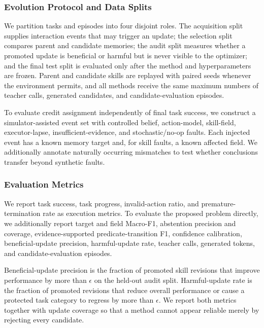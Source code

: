 \subsubsection{Evolution Protocol and Data Splits}

We partition tasks and episodes into four disjoint roles. The acquisition split supplies interaction events that may trigger an update; the selection split compares parent and candidate memories; the audit split measures whether a promoted update is beneficial or harmful but is never visible to the optimizer; and the final test split is evaluated only after the method and hyperparameters are frozen. Parent and candidate skills are replayed with paired seeds whenever the environment permits, and all methods receive the same maximum numbers of teacher calls, generated candidates, and candidate-evaluation episodes.

To evaluate credit assignment independently of final task success, we construct a simulator-assisted event set with controlled belief, action-model, skill-field, executor-lapse, insufficient-evidence, and stochastic/no-op faults. Each injected event has a known memory target and, for skill faults, a known affected field. We additionally annotate naturally occurring mismatches to test whether conclusions transfer beyond synthetic faults.


\subsubsection{Evaluation Metrics}
\label{sec:evaluation_metrics}

We report task success, task progress, invalid-action ratio, and premature-termination rate as execution metrics. To evaluate the proposed problem directly, we additionally report target and field Macro-F1, abstention precision and coverage, evidence-supported predicate-transition F1, confidence calibration, beneficial-update precision, harmful-update rate, teacher calls, generated tokens, and candidate-evaluation episodes.

Beneficial-update precision is the fraction of promoted skill revisions that improve performance by more than $\epsilon$ on the held-out audit split. Harmful-update rate is the fraction of promoted revisions that reduce overall performance or cause a protected task category to regress by more than $\epsilon$. We report both metrics together with update coverage so that a method cannot appear reliable merely by rejecting every candidate.


